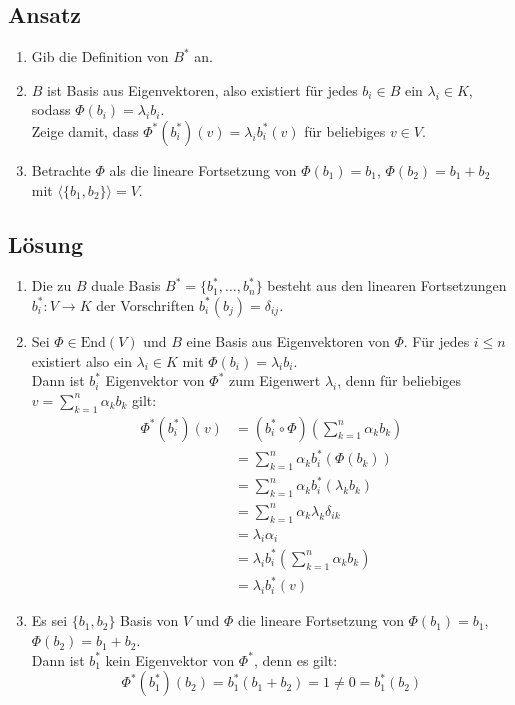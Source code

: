 \subsection{Ansatz}
\begin{enumerate}
	\item Gib die Definition von \( B^\ast \) an.
	\item \( B \) ist Basis aus Eigenvektoren, also existiert für jedes \( b_i \in B \) ein \( \lambda_i \in K \), sodass \( \Phi(b_i)=\lambda_ib_i \).
		\\
		Zeige damit, dass \( \Phi^\ast(b_i^\ast)(v) = \lambda_ib_i^\ast(v) \) für beliebiges \( v \in V \).
	\item Betrachte \( \Phi \) als die lineare Fortsetzung von \( \Phi(b_1) = b_1 \), \( \Phi(b_2) = b_1 + b_2 \) mit \( \langle \{ b_1, b_2 \} \rangle = V \).
\end{enumerate}

\subsection{Lösung}
\begin{enumerate}
	\item Die zu \( B \) duale Basis \( B^\ast = \{ b_1^\ast, \dots, b_n^\ast \} \) besteht aus den linearen Fortsetzungen \( b_i^\ast: V \to K \) der Vorschriften \( b_i^\ast(b_j) = \delta_{ij} \).
	\item Sei \( \Phi \in \text{End}(V) \) und \( B \) eine Basis aus Eigenvektoren von \( \Phi \). Für jedes \( i \leq n  \) existiert also ein \( \lambda_i \in K \) mit \( \Phi(b_i) = \lambda_ib_i \). 
	\\
	Dann ist \( b_i^\ast \) Eigenvektor von \( \Phi^\ast \) zum Eigenwert \( \lambda_i \), denn für beliebiges \( v = \sum_{k=1}^n \alpha_kb_k \) gilt:
	\begin{align*}
	 	\Phi^\ast(b_i^\ast)(v) &= (b_i^\ast \circ \Phi)\left( \sum_{k=1}^n \alpha_kb_k \right) \\
	 	 &= \sum_{k=1}^n \alpha_kb_i^\ast(\Phi(b_k)) \\
	 	 &= \sum_{k=1}^n \alpha_kb_i^\ast(\lambda_kb_k) \\
	 	 &= \sum_{k=1}^n \alpha_k\lambda_k\delta_{ik} \\
	 	 &= \lambda_i\alpha_i \\
	 	 &= \lambda_ib_i^\ast \left( \sum_{k=1}^n \alpha_kb_k \right) \\
	 	 &= \lambda_ib_i^\ast(v)
	 \end{align*} 

	 \item Es sei \( \{ b_1, b_2 \} \) Basis von \( V \) und \( \Phi \) die lineare Fortsetzung von \( \Phi(b_1) = b_1 \), \( \Phi(b_2) = b_1 + b_2 \).
	 	\\
	 	Dann ist \( b_1^\ast \) kein Eigenvektor von \( \Phi^\ast \), denn es gilt:
	 	\begin{equation*}
	 		\Phi^\ast(b_1^\ast)(b_2) = b_1^\ast(b_1 + b_2) = 1 \neq 0 = b_1^\ast(b_2)
	 	\end{equation*}
\end{enumerate}

\newpage